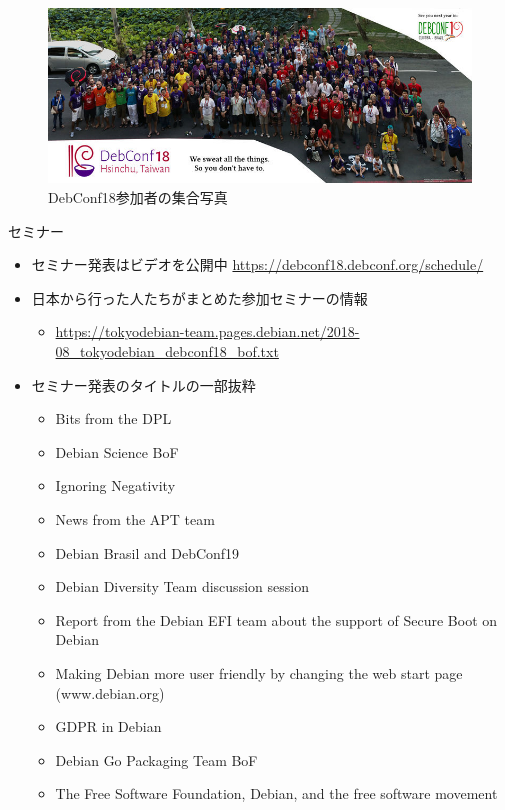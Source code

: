 \documentclass[mingoth,a4paper]{jsarticle}
\begin{document}
\begin{figure}[htbp]
  \begin{center}
    \includegraphics[scale=0.4,bb=0 0 800 331]{image201810/800px-Debconf18_group_photo.jpg}
  \end{center}
  \caption{DebConf18参加者の集合写真}
\end{figure}

セミナー
\begin{itemize}
\item セミナー発表はビデオを公開中 \url{https://debconf18.debconf.org/schedule/}
\item 日本から行った人たちがまとめた参加セミナーの情報
  \begin{itemize}
    \item \url{https://tokyodebian-team.pages.debian.net/2018-08_tokyodebian_debconf18_bof.txt}
  \end{itemize}
\end{itemize}


\begin{itemize}
\item セミナー発表のタイトルの一部抜粋
  \begin{itemize}
  \item Bits from the DPL
  \item Debian Science BoF
  \item Ignoring Negativity
  \item News from the APT team
  \item Debian Brasil and DebConf19
  \item Debian Diversity Team discussion session
  \item Report from the Debian EFI team about the support of Secure Boot on Debian
  \item Making Debian more user friendly by changing the web start page (www.debian.org)
  \item GDPR in Debian
  \item Debian Go Packaging Team BoF
  \item The Free Software Foundation, Debian, and the free software movement
  \end{itemize}
\end{itemize}
\end{document}
